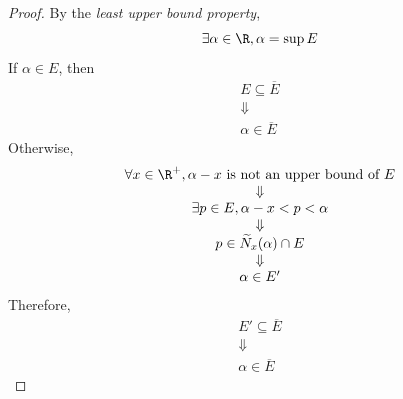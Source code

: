 \begin{proof}
  By the \emph{least upper bound property},
  \[
    \exists \alpha \in \R, \alpha = \sup E
  \]
  If $\alpha \in E$, then
  \[
    \begin{array}{c}
      E \subseteq \overline{E} \\
      \Downarrow               \\
      \alpha \in \overline{E}
    \end{array}
  \]
  Otherwise,
  \[
    \begin{array}{c}
      \forall x \in \R^{+}, \alpha - x \text{ is not an upper bound of } E \\
      \Downarrow                                                           \\
      \exists p \in E, \alpha - x < p < \alpha                             \\
      \Downarrow                                                           \\
      p \in \widetilde{N}_{x}(\alpha) \cap E                               \\
      \Downarrow                                                           \\
      \alpha \in E'
    \end{array}
  \]
  Therefore,
  \[
    \begin{array}{c}
      E' \subseteq \overline{E} \\
      \Downarrow                \\
      \alpha \in \overline{E}
    \end{array}
  \]
\end{proof}
